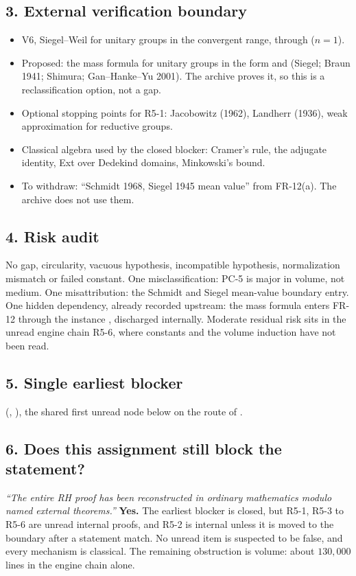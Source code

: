 \documentclass[11pt]{article}
\newcommand{\FR}[1]{\textsf{FR-#1}}
\newcommand{\PC}[1]{\textsf{PC-#1}}
\begin{document}
\subsection*{3. External verification boundary}
\begin{itemize}[leftmargin=*]
\item V6, Siegel--Weil for unitary groups in the convergent range, through  ($n=1$).
\item Proposed: the mass formula for unitary groups in the form  and  (Siegel; Braun 1941; Shimura; Gan--Hanke--Yu 2001). The archive proves it, so this is a reclassification option, not a gap.
\item Optional stopping points for R5-1: Jacobowitz (1962), Landherr (1936), weak approximation for reductive groups.
\item Classical algebra used by the closed blocker: Cramer's rule, the adjugate identity, Ext over Dedekind domains, Minkowski's bound.
\item To withdraw: ``Schmidt 1968, Siegel 1945 mean value'' from \FR{12}(a). The archive does not use them.
\end{itemize}

\subsection*{4. Risk audit}
No gap, circularity, vacuous hypothesis, incompatible hypothesis, normalization mismatch or failed constant. One misclassification: \PC{5} is major in volume, not medium. One misattribution: the Schmidt and Siegel mean-value boundary entry. One hidden dependency, already recorded upstream: the mass formula enters \FR{12} through the  instance , discharged internally. Moderate residual risk sits in the unread engine chain R5-6, where constants and the volume induction have not been read.

\subsection*{5. Single earliest blocker}
 (, ), the shared first unread node below  on the route of .

\subsection*{6. Does this assignment still block the statement?}
\emph{``The entire RH proof has been reconstructed in ordinary mathematics modulo named external theorems.''} \textbf{Yes.} The earliest blocker is closed, but R5-1, R5-3 to R5-6 are unread internal proofs, and R5-2 is internal unless it is moved to the boundary after a statement match. No unread item is suspected to be false, and every mechanism is classical. The remaining obstruction is volume: about $130{,}000$ lines in the engine chain alone.
\end{document}

